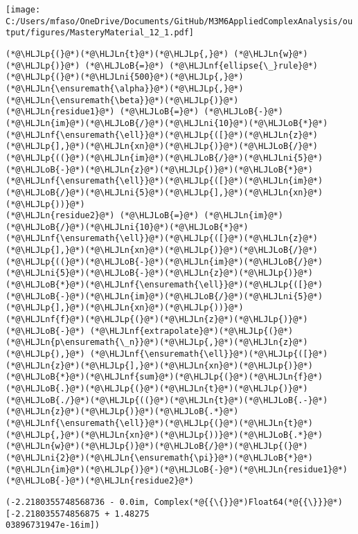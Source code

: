 \documentclass[12pt,a4paper]{article}
\newcommand{\HLJLn}[1]{#1}
\newcommand{\HLJLnf}[1]{\textcolor[RGB]{66,102,213}{#1}}
\newcommand{\HLJLni}[1]{\textcolor[RGB]{59,151,46}{#1}}
\newcommand{\HLJLoB}[1]{\textcolor[RGB]{102,102,102}{\textbf{#1}}}
\newcommand{\HLJLp}[1]{#1}
\begin{document}
\texttt{[image: C:/Users/mfaso/OneDrive/Documents/GitHub/M3M6AppliedComplexAnalysis/output/figures/MasteryMaterial\_12\_1.pdf]}

\begin{lstlisting}
(*@\HLJLp{(}@*)(*@\HLJLn{t}@*)(*@\HLJLp{,}@*) (*@\HLJLn{w}@*)(*@\HLJLp{)}@*) (*@\HLJLoB{=}@*) (*@\HLJLnf{ellipse{\_}rule}@*)(*@\HLJLp{(}@*)(*@\HLJLni{500}@*)(*@\HLJLp{,}@*) (*@\HLJLn{\ensuremath{\alpha}}@*)(*@\HLJLp{,}@*) (*@\HLJLn{\ensuremath{\beta}}@*)(*@\HLJLp{)}@*)
(*@\HLJLn{residue1}@*) (*@\HLJLoB{=}@*) (*@\HLJLoB{-}@*)(*@\HLJLn{im}@*)(*@\HLJLoB{/}@*)(*@\HLJLni{10}@*)(*@\HLJLoB{*}@*)(*@\HLJLnf{\ensuremath{\ell}}@*)(*@\HLJLp{([}@*)(*@\HLJLn{z}@*)(*@\HLJLp{],}@*)(*@\HLJLn{xn}@*)(*@\HLJLp{)}@*)(*@\HLJLoB{/}@*)(*@\HLJLp{((}@*)(*@\HLJLn{im}@*)(*@\HLJLoB{/}@*)(*@\HLJLni{5}@*)(*@\HLJLoB{-}@*)(*@\HLJLn{z}@*)(*@\HLJLp{)}@*)(*@\HLJLoB{*}@*)(*@\HLJLnf{\ensuremath{\ell}}@*)(*@\HLJLp{([}@*)(*@\HLJLn{im}@*)(*@\HLJLoB{/}@*)(*@\HLJLni{5}@*)(*@\HLJLp{],}@*)(*@\HLJLn{xn}@*)(*@\HLJLp{))}@*)
(*@\HLJLn{residue2}@*) (*@\HLJLoB{=}@*) (*@\HLJLn{im}@*)(*@\HLJLoB{/}@*)(*@\HLJLni{10}@*)(*@\HLJLoB{*}@*)(*@\HLJLnf{\ensuremath{\ell}}@*)(*@\HLJLp{([}@*)(*@\HLJLn{z}@*)(*@\HLJLp{],}@*)(*@\HLJLn{xn}@*)(*@\HLJLp{)}@*)(*@\HLJLoB{/}@*)(*@\HLJLp{((}@*)(*@\HLJLoB{-}@*)(*@\HLJLn{im}@*)(*@\HLJLoB{/}@*)(*@\HLJLni{5}@*)(*@\HLJLoB{-}@*)(*@\HLJLn{z}@*)(*@\HLJLp{)}@*)(*@\HLJLoB{*}@*)(*@\HLJLnf{\ensuremath{\ell}}@*)(*@\HLJLp{([}@*)(*@\HLJLoB{-}@*)(*@\HLJLn{im}@*)(*@\HLJLoB{/}@*)(*@\HLJLni{5}@*)(*@\HLJLp{],}@*)(*@\HLJLn{xn}@*)(*@\HLJLp{))}@*)
(*@\HLJLnf{f}@*)(*@\HLJLp{(}@*)(*@\HLJLn{z}@*)(*@\HLJLp{)}@*) (*@\HLJLoB{-}@*) (*@\HLJLnf{extrapolate}@*)(*@\HLJLp{(}@*)(*@\HLJLn{p\ensuremath{\_n}}@*)(*@\HLJLp{,}@*)(*@\HLJLn{z}@*)(*@\HLJLp{),}@*) (*@\HLJLnf{\ensuremath{\ell}}@*)(*@\HLJLp{([}@*)(*@\HLJLn{z}@*)(*@\HLJLp{],}@*)(*@\HLJLn{xn}@*)(*@\HLJLp{)}@*)(*@\HLJLoB{*}@*)(*@\HLJLnf{sum}@*)(*@\HLJLp{(}@*)(*@\HLJLn{f}@*)(*@\HLJLoB{.}@*)(*@\HLJLp{(}@*)(*@\HLJLn{t}@*)(*@\HLJLp{)}@*)(*@\HLJLoB{./}@*)(*@\HLJLp{((}@*)(*@\HLJLn{t}@*)(*@\HLJLoB{.-}@*)(*@\HLJLn{z}@*)(*@\HLJLp{)}@*)(*@\HLJLoB{.*}@*)(*@\HLJLnf{\ensuremath{\ell}}@*)(*@\HLJLp{(}@*)(*@\HLJLn{t}@*)(*@\HLJLp{,}@*)(*@\HLJLn{xn}@*)(*@\HLJLp{))}@*)(*@\HLJLoB{.*}@*)(*@\HLJLn{w}@*)(*@\HLJLp{)}@*)(*@\HLJLoB{/}@*)(*@\HLJLp{(}@*)(*@\HLJLni{2}@*)(*@\HLJLn{\ensuremath{\pi}}@*)(*@\HLJLoB{*}@*)(*@\HLJLn{im}@*)(*@\HLJLp{)}@*)(*@\HLJLoB{-}@*)(*@\HLJLn{residue1}@*)(*@\HLJLoB{-}@*)(*@\HLJLn{residue2}@*)
\end{lstlisting}

\begin{lstlisting}
(-2.2180355748568736 - 0.0im, Complex(*@{{\{}}@*)Float64(*@{{\}}}@*)[-2.218035574856875 + 1.48275
03896731947e-16im])
\end{lstlisting}
\end{document}
